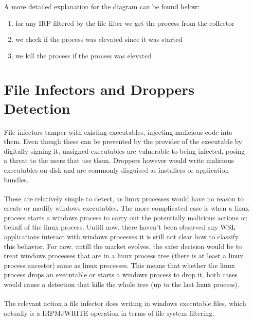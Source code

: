         
        A more detailed explanation for the diagram can be found below:

        \begin{enumerate}
            \item for any IRP filtered by the file filter we get the process from the collector
            \item we check if the process was elevated since it was started
            \item we kill the process if the process was elevated
        \end{enumerate}

    \section{File Infectors and Droppers Detection}
        \paragraph{}
        File infectors tamper with existing executables, injecting malicious code into them. Even though these can be prevented by the provider
        of the executable by digitally signing it, unsigned executables are vulnerable to being infected, posing a threat to the users that
        use them. Droppers however would write malicious executables on disk and are commonly disguised as installers or application bundles.

        \paragraph{}
        These are relatively simple to detect, as linux processes would have no reason to create or modify windows executables. The more
        complicated case is when a linux process starts a windows process to carry out the potentially malicious actions on behalf of the linux
        process. Untill now, there haven't been observed any WSL applications interact with windows processes it is still not clear how to
        classify this behavior. For now, untill the market evolves, the safer decision would be to treat windows processes that are in a
        linux process tree (there is at least a linux process ancestor) same as linux processes. This means that whether the linux process
        drops an executable or starts a windows process to drop it, both cases would cause a detection that kills the whole tree (up to the
        last linux process).

        \paragraph{}
        The relevant action a file infector does writing in windows executable files, which actually is a
        IRP\textunderscore MJ\textunderscore WRITE operation in terms of file system filtering.
